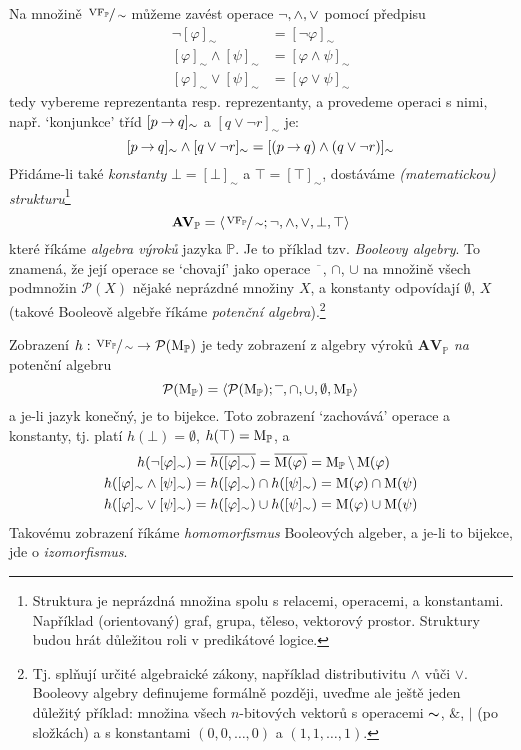 Na množině $\sfrac{\operatorname{VF}_\mathbb P}{\sim}$ můžeme zavést operace $\neg,{\land},{\lor}$ pomocí předpisu
\begin{align*}
    \neg [\varphi]_\sim &=[\neg\varphi]_\sim\\
    [\varphi]_\sim \land [\psi]_\sim &= [\varphi\land\psi]_\sim\\
    [\varphi]_\sim \lor [\psi]_\sim &= [\varphi\lor\psi]_\sim
\end{align*}
tedy vybereme reprezentanta resp. reprezentanty, a provedeme operaci s nimi, např. `konjunkce' tříd $[p\mathbin{\rightarrow} q]_\sim$ a $[q\lor \neg r]_\sim$ je:
$$
[p\mathbin{\rightarrow} q]_\sim\land[q\lor \neg r]_\sim=[(p\mathbin{\rightarrow} q)\land (q\lor \neg r)]_\sim
$$
Přidáme-li také \emph{konstanty} $\bot=[\bot]_\sim$ a $\top=[\top]_\sim$, dostáváme \emph{(matematickou) strukturu}\footnote{Struktura je neprázdná množina spolu s relacemi, operacemi, a konstantami. Například (orientovaný) graf, grupa, těleso, vektorový prostor. Struktury budou hrát důležitou roli v predikátové logice.}
$$
\mathbf{AV}_\mathbb P=\langle \sfrac{\operatorname{VF}_\mathbb P}{\sim}; \neg, {\land}, {\lor}, \bot, \top\rangle
$$
které říkáme \emph{algebra výroků} jazyka $\mathbb P$. Je to příklad tzv. \emph{Booleovy algebry}. To znamená,  že její operace se `chovají' jako operace $\overline{\phantom{x}}$, $\cap$, $\cup$ na množině všech podmnožin $\mathcal P(X)$ nějaké neprázdné množiny $X$, a konstanty odpovídají $\emptyset$, $X$ (takové Booleově algebře říkáme \emph{potenční algebra}).\footnote{Tj. splňují určité algebraické zákony, například distributivitu $\land$ vůči $\lor$. Booleovy algebry definujeme formálně později, uveďme ale ještě jeden důležitý příklad: množina všech $n$-bitových vektorů s operacemi $\thicksim$, $\&$, $|$ (po složkách) a s konstantami $(0,0,\dots,0)$ a $(1,1,\dots,1)$.}

Zobrazení $h:\sfrac{\operatorname{VF}_\mathbb P}{\sim}\to\mathcal P(\operatorname{M}_\mathbb P)$ je tedy zobrazení z algebry výroků $\mathbf{AV}_\mathbb P$ \emph{na} potenční algebru
$$
\mathbf{\mathcal P(\operatorname{M}_\mathbb P)}=\langle \mathcal P(\operatorname{M}_\mathbb P); \overline{\phantom{x}}, \cap, \cup, \emptyset, \operatorname{M}_\mathbb P\rangle
$$
a je-li jazyk konečný, je to bijekce. Toto zobrazení `zachovává' operace a konstanty, tj. platí $h(\bot)=\emptyset$, $h(\top)=\operatorname{M}_\mathbb P$, a
\begin{align*}
    h(\neg[\varphi]_\sim)&=\overline{h([\varphi]_\sim)}=\overline{\operatorname{M}(\varphi)}=\operatorname{M}_\mathbb P\setminus\operatorname{M}(\varphi)\\
    h([\varphi]_\sim\land[\psi]_\sim)&=h([\varphi]_\sim)\cap h([\psi]_\sim)=\operatorname{M}(\varphi)\cap\operatorname{M}(\psi)\\
    h([\varphi]_\sim\lor[\psi]_\sim)&=h([\varphi]_\sim)\cup h([\psi]_\sim)=\operatorname{M}(\varphi)\cup\operatorname{M}(\psi)
\end{align*}
Takovému zobrazení říkáme \emph{homomorfismus} Booleových algeber, a je-li to bijekce, jde o \emph{izomorfismus}. 

